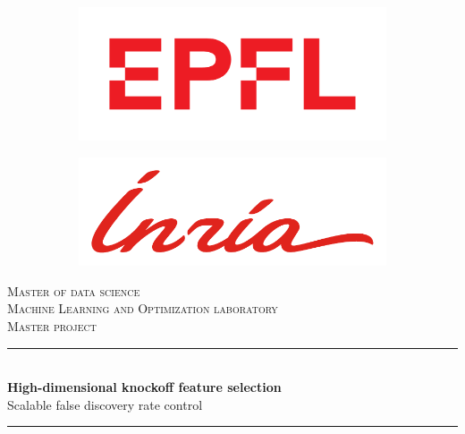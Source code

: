 
\begin{titlepage}
\begin{center}


\null\vspace{2cm}

\begin{figure}[H]
	\centering
	\begin{subfigure}{.5\textwidth}
		\centering
		\includegraphics[width=0.6\linewidth]{figures/epfl.pdf}
	\end{subfigure}%
	\begin{subfigure}{.5\textwidth}
		\centering
		\includegraphics[width=0.6\linewidth]{figures/inria_pms.pdf}
	\end{subfigure}
\end{figure}

\vspace{2cm}

\textsc{\Large Master of data science}\\[8pt]
\textsc{\large Machine Learning and Optimization laboratory}\\[2pt]
\textsc{\large Master project}\\

\vspace{1cm}

\rule{0.85\textwidth}{1.5pt}\\[8pt]
{\huge \textbf{High-dimensional knockoff feature selection}}\\[6pt]
{\Large Scalable false discovery rate control}\\[2pt]
\rule{0.85\textwidth}{1.5pt}\\

\vspace{2cm}


\end{center}
\end{titlepage}
